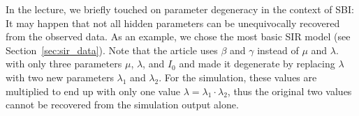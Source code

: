 In the lecture, we briefly touched on parameter degeneracy in the context of SBI: It may happen that not all hidden parameters can be unequivocally recovered from the observed data. As an example, we chose the most basic SIR model (see Section~\ref{sec:sir_data}). Note that the article uses $\beta$ and $\gamma$ instead of $\mu$ and $\lambda$. with only three parameters $\mu$, $\lambda$, and $I_0$ and made it degenerate by replacing $\lambda$ with two new parameters $\lambda_1$ and $\lambda_2$. For the simulation, these values are multiplied to end up with only one value $\lambda = \lambda_1 \cdot \lambda_2$, thus the original two values cannot be recovered from the simulation output alone.
